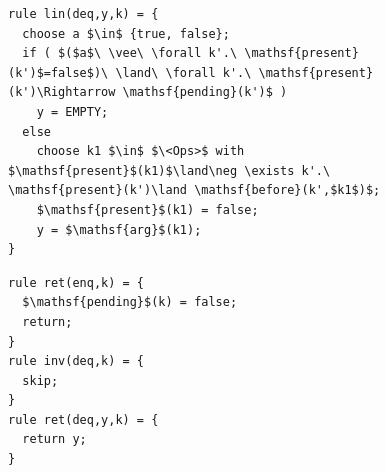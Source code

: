 \begin{figure}[t]
\begin{minipage}[t]{7.5cm}
\begin{lstlisting}
rule lin(deq,y,k) = {
  choose a $\in$ {true, false};
  if ( $($a$\ \vee\ \forall k'.\ \mathsf{present}(k')$=false$)\ \land\ \forall k'.\ \mathsf{present}(k')\Rightarrow \mathsf{pending}(k')$ ) 
    y = EMPTY;
  else 
    choose k1 $\in$ $\<Ops>$ with $\mathsf{present}$(k1)$\land\neg \exists k'.\ \mathsf{present}(k')\land \mathsf{before}(k',$k1$)$;
    $\mathsf{present}$(k1) = false;
    y = $\mathsf{arg}$(k1);
}
\end{lstlisting}
\end{minipage}
\begin{minipage}[t]{5cm}
\vspace{-3mm}
\begin{lstlisting}
rule ret(enq,k) = {
  $\mathsf{pending}$(k) = false;
  return;
}
rule inv(deq,k) = {
  skip;
}
rule ret(deq,y,k) = {
  return y;
}
\end{lstlisting}
\end{minipage}



\end{figure}
